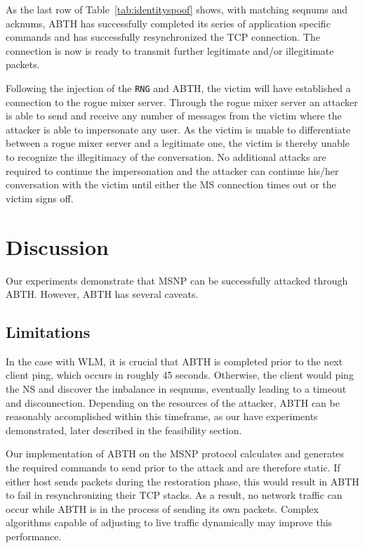 \documentclass{sig-alternate}
\begin{document}
As the last row of Table~\ref{tab:identityspoof} shows, with matching seqnums and acknums, ABTH has successfully completed its series of application specific commands and has successfully resynchronized the TCP connection.
The connection is now is ready to transmit further legitimate and/or illegitimate packets.

Following the injection of the \texttt{RNG} and ABTH, the victim will have established a connection to the rogue mixer server.
Through the rogue mixer server an attacker is able to send and receive any number of messages from the victim where the attacker is able to impersonate any user.
As the victim is unable to differentiate between a rogue mixer server and a legitimate one, the victim is thereby unable to recognize the illegitimacy of the conversation.
No additional attacks are required to continue the impersonation and the attacker can continue his/her conversation with the victim until either the MS connection times out or the victim signs off.

\section{Discussion}
\label{sec:discussion}

Our experiments demonstrate that MSNP can be successfully attacked through ABTH.
However, ABTH has several caveats.

\subsection{Limitations}

In the case with WLM, it is crucial that ABTH is completed prior to the next client ping, which occurs in roughly 45 seconds.
Otherwise, the client would ping the NS and discover the imbalance in seqnums, eventually leading to a timeout and disconnection.
Depending on the resources of the attacker, ABTH can be reasonably accomplished within this timeframe, as our have experiments demonstrated, later described in the feasibility section.

Our implementation of ABTH on the MSNP protocol calculates and generates the required commands to send prior to the attack and are therefore static.
If either host sends packets during the restoration phase, this would result in ABTH to fail in resynchronizing their TCP stacks.
As a result, no network traffic can occur while ABTH is in the process of sending its own packets.
Complex algorithms capable of adjusting to live traffic dynamically may improve this performance.
\end{document}
